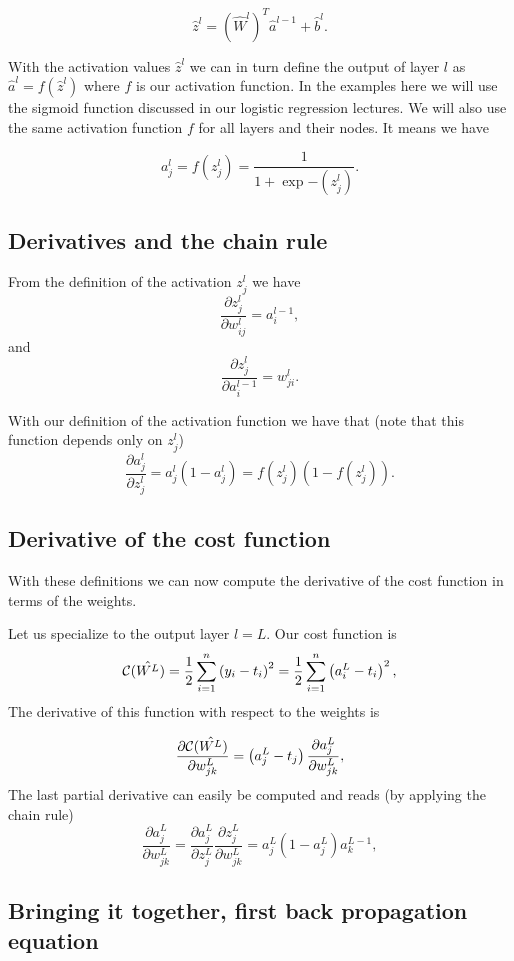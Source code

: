 \documentclass[%
oneside,                 %
final,                   %
10pt]{article}
\begin{document}
\[
\hat{z}^l = \left(\hat{W}^l\right)^T\hat{a}^{l-1}+\hat{b}^l.
\]

With the activation values $\hat{z}^l$ we can in turn define the
output of layer $l$ as $\hat{a}^l = f(\hat{z}^l)$ where $f$ is our
activation function. In the examples here we will use the sigmoid
function discussed in our logistic regression lectures. We will also use the same activation function $f$ for all layers
and their nodes.  It means we have

\[
a_j^l = f(z_j^l) = \frac{1}{1+\exp{-(z_j^l)}}.
\]


\subsection{Derivatives and the chain rule}

From the definition of the activation $z_j^l$ we have
\[
\frac{\partial z_j^l}{\partial w_{ij}^l} = a_i^{l-1},
\]
and
\[
\frac{\partial z_j^l}{\partial a_i^{l-1}} = w_{ji}^l. 
\]

With our definition of the activation function we have that (note that this function depends only on $z_j^l$)
\[
\frac{\partial a_j^l}{\partial z_j^{l}} = a_j^l(1-a_j^l)=f(z_j^l)(1-f(z_j^l)). 
\]


\subsection{Derivative of the cost function}

With these definitions we can now compute the derivative of the cost function in terms of the weights.

Let us specialize to the output layer $l=L$. Our cost function is
\[
{\cal C}(\hat{W^L})  =  \frac{1}{2}\sum_{i=1}^n\left(y_i - t_i\right)^2=\frac{1}{2}\sum_{i=1}^n\left(a_i^L - t_i\right)^2, 
\]
The derivative of this function with respect to the weights is

\[
\frac{\partial{\cal C}(\hat{W^L})}{\partial w_{jk}^L}  =  \left(a_j^L - t_j\right)\frac{\partial a_j^L}{\partial w_{jk}^{L}}, 
\]
The last partial derivative can easily be computed and reads (by applying the chain rule)
\[
\frac{\partial a_j^L}{\partial w_{jk}^{L}} = \frac{\partial a_j^L}{\partial z_{j}^{L}}\frac{\partial z_j^L}{\partial w_{jk}^{L}}=a_j^L(1-a_j^L)a_k^{L-1},  
\]



\subsection{Bringing it together, first back propagation equation}
\end{document}
